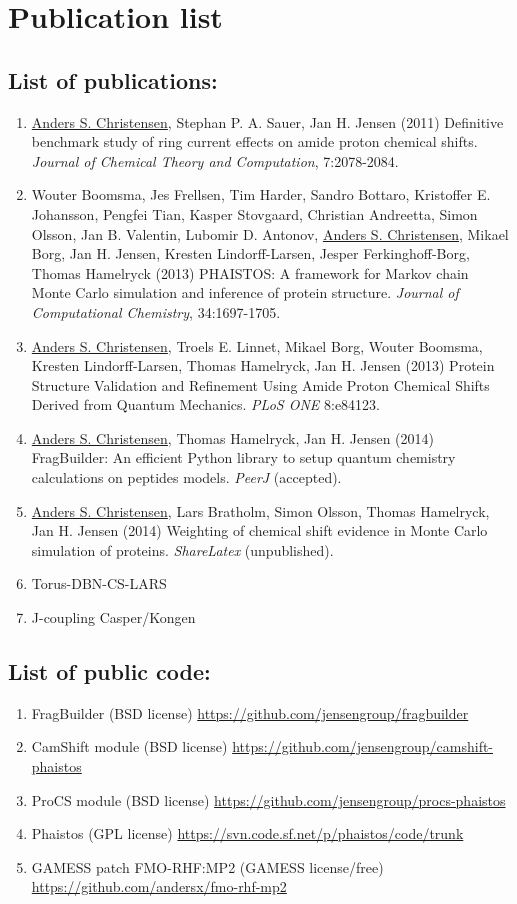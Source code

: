 \chapter*{Publication list}

\section*{List of publications:}
\begin{enumerate}
    \item \underline{Anders S. Christensen}, Stephan P. A. Sauer, Jan H. Jensen (2011) Definitive benchmark study of ring current effects on amide proton chemical shifts. \textit{Journal of Chemical Theory and Computation}, 7:2078-2084.
    \item Wouter Boomsma, Jes Frellsen, Tim Harder, Sandro Bottaro, Kristoffer E. Johansson, Pengfei Tian, Kasper Stovgaard, Christian Andreetta, Simon Olsson, Jan B. Valentin, Lubomir D. Antonov, \underline{Anders S. Christensen}, Mikael Borg, Jan H. Jensen, Kresten Lindorff-Larsen, Jesper Ferkinghoff-Borg, Thomas Hamelryck (2013) PHAISTOS: A framework for Markov chain Monte Carlo simulation and inference of protein structure. \textit{Journal of Computational Chemistry}, 34:1697-1705.
    \item  \underline{Anders S. Christensen}, Troels E. Linnet, Mikael Borg, Wouter Boomsma, Kresten Lindorff-Larsen, Thomas Hamelryck, Jan H. Jensen (2013)  Protein Structure Validation and Refinement Using Amide Proton Chemical Shifts Derived from Quantum Mechanics. \textit{PLoS ONE} 8:e84123.
    \item \underline{Anders S. Christensen}, Thomas Hamelryck, Jan H. Jensen (2014) FragBuilder: An efficient Python library to setup quantum chemistry calculations on peptides models. \textit{PeerJ} (accepted).
    \item \underline{Anders S. Christensen}, Lars Bratholm, Simon Olsson, Thomas Hamelryck, Jan H. Jensen (2014) Weighting of chemical shift evidence in Monte Carlo simulation of proteins. \textit{ShareLatex} (unpublished).
    \item Torus-DBN-CS-LARS
    \item J-coupling Casper/Kongen
\end{enumerate}
\section*{List of public code:}
\begin{enumerate}
    \item FragBuilder (BSD license) \url{https://github.com/jensengroup/fragbuilder}
    \item CamShift module (BSD license) \url{https://github.com/jensengroup/camshift-phaistos}
    \item ProCS module (BSD license) \url{https://github.com/jensengroup/procs-phaistos}
    \item Phaistos (GPL license) \url{https://svn.code.sf.net/p/phaistos/code/trunk}
    \item GAMESS patch FMO-RHF:MP2 (GAMESS license/free) \url{https://github.com/andersx/fmo-rhf-mp2}
\end{enumerate}
